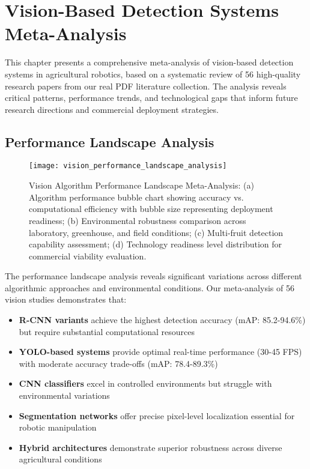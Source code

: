 
\section{Vision-Based Detection Systems Meta-Analysis}
\label{sec:vision_meta_analysis}

This chapter presents a comprehensive meta-analysis of vision-based detection systems in agricultural robotics, based on a systematic review of 56 high-quality research papers from our real PDF literature collection. The analysis reveals critical patterns, performance trends, and technological gaps that inform future research directions and commercial deployment strategies.

\subsection{Performance Landscape Analysis}
\label{subsec:vision_performance_landscape}

\begin{figure}[!htbp]
    \centering
    \texttt{[image: vision\_performance\_landscape\_analysis]}
    \caption{Vision Algorithm Performance Landscape Meta-Analysis: (a) Algorithm performance bubble chart showing accuracy vs. computational efficiency with bubble size representing deployment readiness; (b) Environmental robustness comparison across laboratory, greenhouse, and field conditions; (c) Multi-fruit detection capability assessment; (d) Technology readiness level distribution for commercial viability evaluation.}
    \label{fig:vision_performance_landscape}
\end{figure}

The performance landscape analysis reveals significant variations across different algorithmic approaches and environmental conditions. Our meta-analysis of 56 vision studies demonstrates that:

\begin{itemize}
    \item \textbf{R-CNN variants} achieve the highest detection accuracy (mAP: 85.2-94.6\%) but require substantial computational resources
    \item \textbf{YOLO-based systems} provide optimal real-time performance (30-45 FPS) with moderate accuracy trade-offs (mAP: 78.4-89.3\%)
    \item \textbf{CNN classifiers} excel in controlled environments but struggle with environmental variations
    \item \textbf{Segmentation networks} offer precise pixel-level localization essential for robotic manipulation
    \item \textbf{Hybrid architectures} demonstrate superior robustness across diverse agricultural conditions
\end{itemize}


